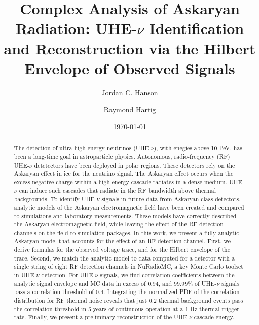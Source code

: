 \documentclass[amsmath,amssymb,aps,prd,10pt,twocolumn,showkeys]{revtex4}
\begin{document}
\title{Complex Analysis of Askaryan Radiation: UHE-$\nu$ Identification and Reconstruction via the Hilbert Envelope of Observed Signals}

\author{Jordan C. Hanson}
\author{Raymond Hartig}
\date{\today}

\begin{abstract}
The detection of ultra-high energy neutrinos (UHE-$\nu$), with enegies above 10 PeV, has been a long-time goal in astroparticle physics.  Autonomous, radio-frequency (RF) UHE-$\nu$ detetectors have been deployed in polar regions.  These detectors rely on the Askaryan effect in ice for the neutrino signal.  The Askaryan effect occurs when the excess negative charge within a high-energy cascade radiates in a dense medium.  UHE-$\nu$ can induce such cascades that radiate in the RF bandwidth above thermal backgrounds.  To identify UHE-$\nu$ signals in future data from Askaryan-class detectors, analytic models of the Askaryan electromagnetic field have been created and compared to simulations and laboratory measurements.  These models have correctly described the Askaryan electromagnetic field, while leaving the effect of the RF detection channels on the field to simulation packages.  In this work, we present a fully analytic Askaryan model that accounts for the effect of an RF detection channel.  First, we derive formulas for the observed voltage trace, and for the Hilbert envelope of the trace.  Second, we match the analytic model to data computed for a detector with a single string of eight RF detection channels in NuRadioMC, a key Monte Carlo toolset in UHE-$\nu$ detection.  For UHE-$\nu$ signals, we find correlation coefficients between the analytic signal envelope and MC data in excess of $0.94$, and 99.99\% of UHE-$\nu$ signals pass a correlation threshold of 0.4.  Integrating the normalized PDF of the correlation distribution for RF thermal noise reveals that just 0.2 thermal background events pass the correlation threshold in 5 years of continuous operation at a 1 Hz thermal trigger rate.  Finally, we present a preliminary reconstruction of the UHE-$\nu$ cascade energy.
\end{abstract}


\maketitle
\end{document}
